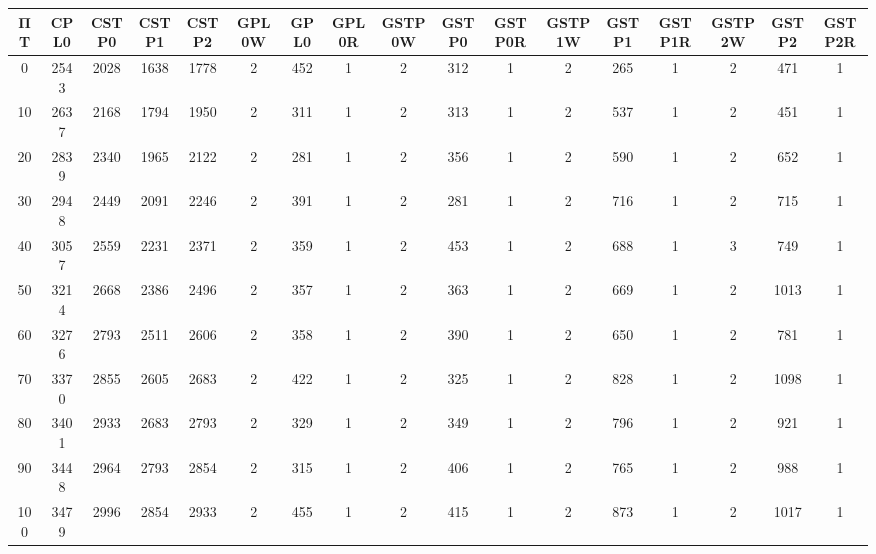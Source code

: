 \begin{tabular}{|c|c|c|c|c|c|c|c|c|c|c|c|c|c|c|c|c|}
\hline
ΠΤ&CPL0&CSTP0&CSTP1&CSTP2&GPL0W&GPL0&GPL0R&GSTP0W&GSTP0&GSTP0R&GSTP1W&GSTP1&GSTP1R&GSTP2W&GSTP2&GSTP2R\\
\hline
\hline
0&2543&2028&1638&1778&2&452&1&2&312&1&2&265&1&2&471&1\\
\hline
10&2637&2168&1794&1950&2&311&1&2&313&1&2&537&1&2&451&1\\
\hline
20&2839&2340&1965&2122&2&281&1&2&356&1&2&590&1&2&652&1\\
\hline
30&2948&2449&2091&2246&2&391&1&2&281&1&2&716&1&2&715&1\\
\hline
40&3057&2559&2231&2371&2&359&1&2&453&1&2&688&1&3&749&1\\
\hline
50&3214&2668&2386&2496&2&357&1&2&363&1&2&669&1&2&1013&1\\
\hline
60&3276&2793&2511&2606&2&358&1&2&390&1&2&650&1&2&781&1\\
\hline
70&3370&2855&2605&2683&2&422&1&2&325&1&2&828&1&2&1098&1\\
\hline
80&3401&2933&2683&2793&2&329&1&2&349&1&2&796&1&2&921&1\\
\hline
90&3448&2964&2793&2854&2&315&1&2&406&1&2&765&1&2&988&1\\
\hline
100&3479&2996&2854&2933&2&455&1&2&415&1&2&873&1&2&1017&1\\
\hline
\end{tabular}
